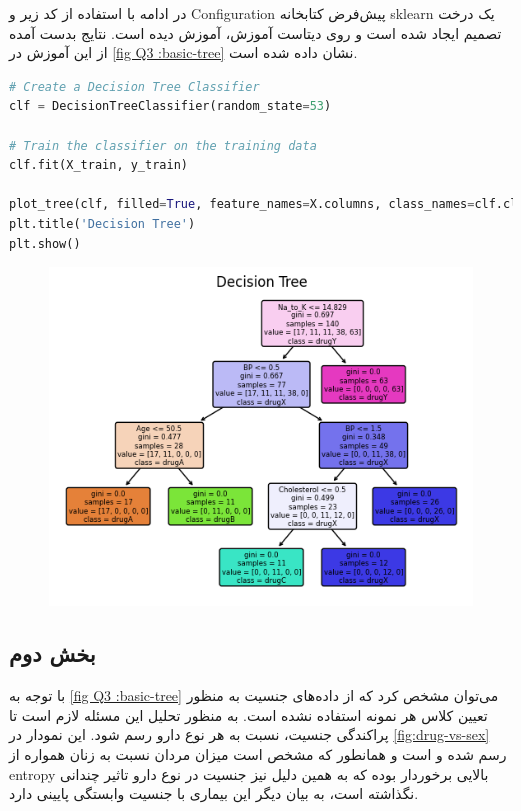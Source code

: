 \documentclass{article}
\begin{document}
در ادامه با استفاده از کد زیر و 
Configuration
پیش‌فرض کتابخانه
sklearn
یک درخت تصمیم ایجاد شده است و روی دیتاست آموزش، آموزش دیده است. نتایج بدست آمده از این آموزش در 
\autoref{fig Q3 :basic-tree}
نشان داده شده است.
\begin{LTR}
	\begin{lstlisting}[language=Python, caption=Train Decision Tree]
# Create a Decision Tree Classifier
clf = DecisionTreeClassifier(random_state=53)

# Train the classifier on the training data
clf.fit(X_train, y_train)

plot_tree(clf, filled=True, feature_names=X.columns, class_names=clf.classes_, rounded=True)
plt.title('Decision Tree')
plt.show()
	\end{lstlisting}
\end{LTR}


\begin{figure}[H]
\centering
\includegraphics[width=1\linewidth]{"img/Q3/basic tree"}
\caption{}
\label{fig Q3 :basic-tree}
\end{figure}

\subsection{بخش دوم}
با توجه به 
‎\autoref{fig Q3 :basic-tree}
 می‌توان مشخص کرد که از داده‌های جنسیت به منظور تعیین کلاس هر نمونه استفاده نشده است. به منظور تحلیل این مسئله لازم است تا پراکندگی جنسیت، نسبت به هر نوع دارو رسم شود. این نمودار در 
\autoref{fig:drug-vs-sex}
 رسم شده و است و همانطور که مشخص است میزان مردان نسبت به زنان همواره از 
 entropy
 بالایی برخوردار بوده که به همین دلیل نیز جنسیت در نوع دارو تاثیر چندانی نگذاشته است، به بیان دیگر این بیماری با جنسیت وابستگی پایینی دارد.
 
\end{document}
